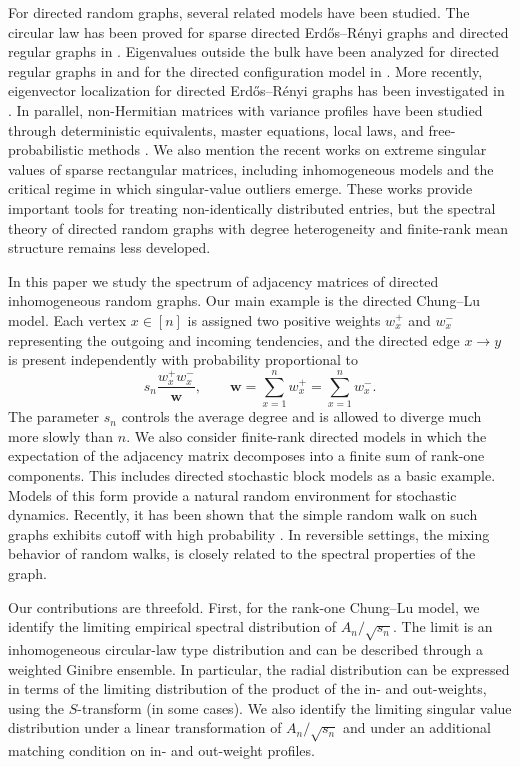 \documentclass[11pt,oneside]{amsart}
\theoremstyle{plain}
\numberwithin{equation}{section}
\newcommand{\w}{\boldsymbol{w}}
\newcommand{\scaling}{s_n}
\begin{document}
For directed random graphs, several related models have been studied. The circular law has been proved
for sparse directed Erd\H{o}s--R\'enyi graphs and directed regular graphs in \cite{BasakRudelson19-arxiv,Cook,sparsedigraph}. Eigenvalues outside the bulk have been analyzed for directed regular graphs in
\cite{B,Coste_Lambert_Zhou} and for the directed configuration model in \cite{Coste}. More recently,
eigenvector localization for directed Erd\H{o}s--R\'enyi graphs has been investigated in \cite{CritErd}. In
parallel, non-Hermitian matrices with variance profiles have been studied through deterministic
equivalents, master equations, local laws, and free-probabilistic methods
\cite{CookI,COOKII,AltErdosKruger,XiYangYin-local,BigotMale,HachemLouvaris}. We also mention the recent works \cite{Dumitriu_2024,DumitriuWangWangZhu25} on extreme singular values of sparse rectangular matrices, including inhomogeneous models and the critical regime in which singular-value outliers emerge. These works provide
important tools for treating non-identically distributed entries, but the spectral theory of directed
random graphs with degree heterogeneity and finite-rank mean structure remains less developed.


In this paper we study the spectrum of adjacency matrices of directed inhomogeneous random graphs. Our main example is the directed Chung--Lu model. Each vertex $x\in [n]$ is assigned two positive weights $w_x^{+}$ and $w_x^{-}$ representing the outgoing and incoming tendencies, and the directed edge $x\to y$ is present independently with probability proportional to 
$$\scaling \frac{w_x^{+}w_x^{-}}{\w},\qquad \w=\sum_{x=1}^n w_x^{+}=\sum_{x=1}^n w_x^{-}.$$
The parameter $\scaling$ controls the average degree and is allowed to diverge much more slowly than $n$. We also
consider finite-rank directed models in which the expectation of the adjacency matrix decomposes into a
finite sum of rank-one components. This includes directed stochastic block models as a basic example. Models of this form provide a natural random environment for stochastic dynamics. Recently, it has been shown that the simple random walk on such graphs exhibits cutoff with high probability \cite{BP,BPQ}. In reversible settings, the mixing behavior of random walks, is closely related to the spectral properties of the graph. 

Our contributions are threefold. First, for the rank-one Chung--Lu model, we identify the limiting empirical spectral distribution of $A_n / \sqrt{s_n}$. The limit is an inhomogeneous circular-law type distribution and can be described through a weighted Ginibre ensemble. In particular, the radial distribution can be expressed in terms of the limiting distribution of the product of the in- and out-weights, using the $S$-transform (in some cases). We also identify the limiting singular value distribution under a linear transformation of $A_n / \sqrt{s_n}$ and under an additional matching condition on in- and out-weight profiles.
\end{document}
